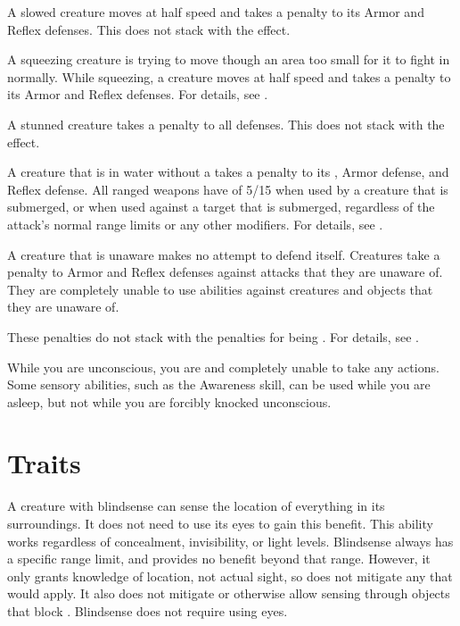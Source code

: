    A slowed creature moves at half speed and takes a  penalty to its Armor and Reflex defenses.
  This does not stack with the \immobilized effect.

   A squeezing creature is trying to move though an area too small for it to fight in normally.
  While squeezing, a creature moves at half speed and takes a  penalty to its Armor and Reflex defenses.
  For details, see .

   A stunned creature takes a  penalty to all defenses.
  This does not stack with the \confused effect.

   A creature that is in water without a  takes a  penalty to its , Armor defense, and Reflex defense.
  All ranged weapons have  of 5/15 when used by a creature that is submerged, or when used against a target that is submerged, regardless of the attack's normal range limits or any other modifiers.
  For details, see .

   A creature that is unaware makes no attempt to defend itself.
  Creatures take a  penalty to Armor and Reflex defenses against attacks that they are unaware of.
  They are completely unable to use  abilities against creatures and objects that they are unaware of.

  These penalties do not stack with the penalties for being \partiallyunaware.
  For details, see .

   While you are unconscious, you are \helpless and completely unable to take any actions.
  Some sensory abilities, such as the Awareness skill, can be used while you are asleep, but not while you are forcibly knocked unconscious.

  \newpage
\section{Traits}\label{Traits}

  A creature with blindsense can sense the location of everything in its surroundings.
  It does not need to use its eyes to gain this benefit.
  This ability works regardless of concealment, invisibility, or light levels.
  Blindsense always has a specific range limit, and provides no benefit beyond that range.
  However, it only grants knowledge of location, not actual sight, so does not mitigate any  that would apply.
  It also does not mitigate  or otherwise allow sensing through objects that block .
  Blindsense does not require using eyes.


